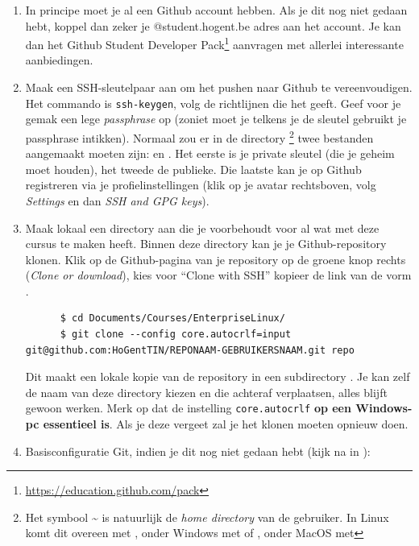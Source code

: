 \begin{enumerate}
  \item In principe moet je al een Github account hebben. Als je dit nog niet gedaan hebt, koppel dan zeker je @student.hogent.be adres aan het account. Je kan dan het Github Student Developer Pack\footnote{\url{https://education.github.com/pack}} aanvragen met allerlei interessante aanbiedingen.
  \item Maak een SSH-sleutelpaar aan om het pushen naar Github te vereenvoudigen. Het commando is \texttt{ssh-keygen}, volg de richtlijnen die het geeft. Geef voor je gemak een lege \emph{passphrase} op (zoniet moet je telkens je de sleutel gebruikt je passphrase intikken). Normaal zou er in de directory \footnote{Het symbool {\textasciitilde} is natuurlijk de \emph{home directory} van de gebruiker. In Linux komt dit overeen met , onder Windows met  of , onder MacOS met } twee bestanden aangemaakt moeten zijn:  en . Het eerste is je private sleutel (die je geheim moet houden), het tweede de publieke. Die laatste kan je op Github registreren via je profielinstellingen (klik op je avatar rechtsboven, volg \emph{Settings} en dan \emph{SSH and GPG keys}).
  \item Maak lokaal een directory aan die je voorbehoudt voor al wat met deze cursus te maken heeft. Binnen deze directory kan je je Github-repository klonen. Klik op de Github-pagina van je repository op de groene knop rechts (\emph{Clone or download}), kies voor ``Clone with SSH'' kopieer de link van de vorm .

    \begin{verbatim}
      $ cd Documents/Courses/EnterpriseLinux/
      $ git clone --config core.autocrlf=input git@github.com:HoGentTIN/REPONAAM-GEBRUIKERSNAAM.git repo
    \end{verbatim}

    Dit maakt een lokale kopie van de repository in een subdirectory . Je kan zelf de naam van deze directory kiezen en die achteraf verplaatsen, alles blijft gewoon werken. Merk op dat de instelling \texttt{core.autocrlf} \textbf{op een Windows-pc essentieel is}. Als je deze vergeet zal je het klonen moeten opnieuw doen.

  \item Basisconfiguratie Git, indien je dit nog niet gedaan hebt (kijk na in ):


\end{enumerate}
